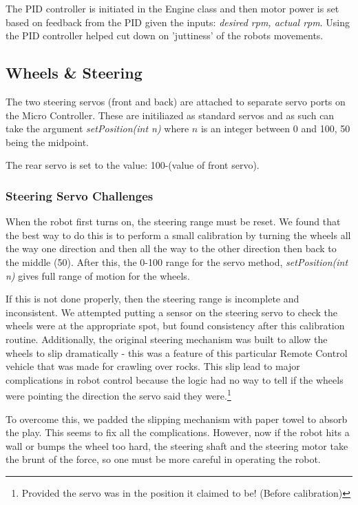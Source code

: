\documentclass[12pt]{article}
\begin{document}
The PID controller is initiated in the Engine class and then motor power is set based on feedback from the PID given the inputs: \textit{desired rpm, actual rpm}.  Using the PID controller helped cut down on 'juttiness' of the robots movements.

\clearpage
\subsection{Wheels \& Steering}
The two steering servos (front and back) are attached to separate servo ports on the Micro Controller.  These are initiliazed as standard servos and as such can take the argument \textit{setPosition(int n)} where $n$ is an integer between 0 and 100, 50 being the midpoint.

The rear servo is set to the value: 100-(value of front servo).

\subsubsection*{Steering Servo Challenges}
When the robot first turns on, the steering range must be reset.  We found that the best way to do this is to perform a small calibration by turning the wheels all the way one direction and then all the way to the other direction then back to the middle (50).  After this, the 0-100 range for the servo method, \textit{setPosition(int n)} gives full range of motion for the wheels.

If this is not done properly, then the steering range is incomplete and inconsistent.  We attempted putting a sensor on the steering servo to check the wheels were at the appropriate spot, but found consistency after this calibration routine.
\vspace{2mm}
Additionally, the original steering mechanism was built to allow the wheels to slip dramatically - this was a feature of this particular Remote Control vehicle that was made for crawling over rocks.  This slip lead to major complications in robot control because the logic had no way to tell if the wheels were pointing the direction the servo said they were.\footnote{Provided the servo was in the position it claimed to be! (Before calibration)}

To overcome this, we padded the slipping mechanism with paper towel to absorb the play.  This seems to fix all the complications.  However, now if the robot hits a wall or bumps the wheel too hard, the steering shaft and the steering motor take the brunt of the force, so one must be more careful in operating the robot.
\end{document}
